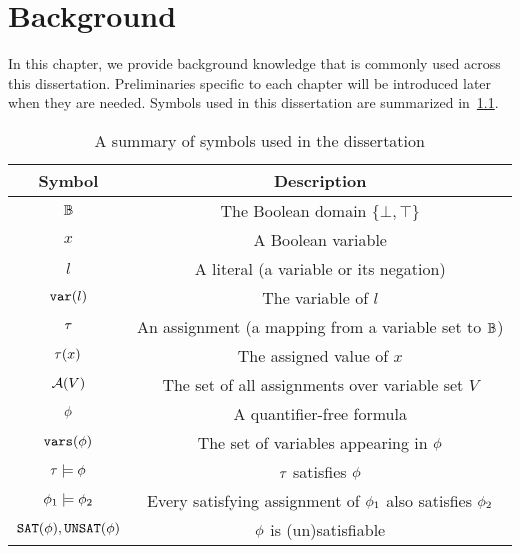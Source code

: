 \chapter{Background}
\label{chap:background}

In this chapter, we provide background knowledge that is commonly used across this dissertation.
Preliminaries specific to each chapter will be introduced later when they are needed.
Symbols used in this dissertation are summarized in~\cref{tbl:background-symbols}.

\begin{table}[t]
    \centering
    \caption{A summary of symbols used in the dissertation}
    \label{tbl:background-symbols}
    \begin{tabular}{c|c}
        Symbol                      & Description                                                   \\
        \hline
        $\mathbb{B}$                  & The Boolean domain $\{\bot,\top\}$                            \\
        $x$                         & A Boolean variable                                            \\
        $l$                         & A literal (a variable or its negation)                        \\
        $\texttt{var}(l)$                    & The variable of $l$                                           \\
        $\tau$                       & An assignment (a mapping from a variable set to $\mathbb{B}$)   \\
        $\tau(x)$                    & The assigned value of $x$                                     \\
        $\mathcal{A}(V)$                    & The set of all assignments over variable set $V$              \\
        $\phi$                       & A quantifier-free formula                                     \\
        $\texttt{vars}(\phi)$                  & The set of variables appearing in $\phi$                       \\
        $\tau\models\phi$             & $\tau$ satisfies $\phi$                                         \\
        $\phi_1\models\phi_2$         & Every satisfying assignment of $\phi_1$ also satisfies $\phi_2$ \\
        $\texttt{SAT}(\phi),\texttt{UNSAT}(\phi)$     & $\phi$ is (un)satisfiable                                      \\

\end{tabular}
\end{table}
